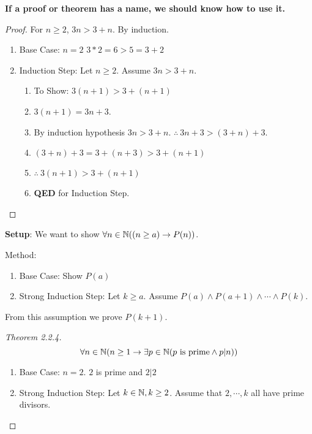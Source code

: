\textbf{If a proof or theorem has a name, we should know how to use it.}
\begin{proof}
For $n \ge 2$, $3n > 3+n$. By induction.
\begin{enumerate}
	\item Base Case: $n=2$ $3*2 = 6 > 5 = 3 + 2$ \checkmark
	\item Induction Step: Let $n \ge 2$. Assume $3n > 3 +n$.
		\begin{enumerate}
			\item To Show: $3(n+1)>3+(n+1)$
			\item $3(n+1)=3n+3$.
			\item By induction hypothesis $3n > 3+n$. $\therefore\ 3n+3>(3+n)+3$.
			\item $(3+n)+3=3+(n+3)>3+(n+1)$
			\item $\therefore\ 3(n+1) > 3+(n+1)$
			\item \textbf{QED} for Induction Step.
		\end{enumerate}
\end{enumerate}
\end{proof}
\textbf{Setup}: We want to show $\forall n \in \mathbb{N} ( (n \ge a) \to P(n))$.
\begin{definition}Method:
\begin{enumerate}
\item Base Case: Show $P(a)$
\item Strong Induction Step: Let $k\ge a$. Assume $P(a) \wedge P(a+1)\wedge \cdots \wedge P(k)$.
\end{enumerate}
From this assumption we prove $P(k+1)$.
\end{definition}
\begin{proof}[Theorem 2.2.4]
\[\forall n \in \mathbb{N} ( n \ge 1 \to \exists p \in \mathbb{N} ( p \text{ is prime} \wedge p|n)) \]
\begin{enumerate}
\item Base Case: $n = 2$. $2$ is prime and $2|2$ \checkmark
\item Strong Induction Step: Let $k \in \mathbb{N}, k \ge 2$. Assume that $2,\cdots,k$ all have prime divisors.
\end{enumerate}
\end{proof}


